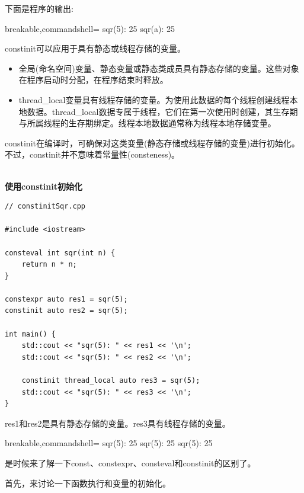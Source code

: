 下面是程序的输出:

\begin{tcblisting}{breakable,commandshell={}}
sqr(5): 25
sqr(a): 25
\end{tcblisting}


constinit可以应用于具有静态或线程存储的变量。

\begin{itemize}
\item 
全局(命名空间)变量、静态变量或静态类成员具有静态存储的变量。这些对象在程序启动时分配，在程序结束时释放。

\item 
thread\_local变量具有线程存储的变量。为使用此数据的每个线程创建线程本地数据。thread\_local数据专属于线程，它们在第一次使用时创建，其生存期与所属线程的生存期绑定。线程本地数据通常称为线程本地存储变量。
\end{itemize}

constinit在编译时，可确保对这类变量(静态存储或线程存储的变量)进行初始化。不过，constinit并不意味着常量性(consteness)。

\hspace*{\fill} \\ %
\noindent
\textbf{使用constinit初始化}
\begin{lstlisting}[style=styleCXX]
// constinitSqr.cpp

#include <iostream>

consteval int sqr(int n) {
	return n * n;
}

constexpr auto res1 = sqr(5);
constinit auto res2 = sqr(5);

int main() {
	std::cout << "sqr(5): " << res1 << '\n';
	std::cout << "sqr(5): " << res2 << '\n';
	
	constinit thread_local auto res3 = sqr(5);
	std::cout << "sqr(5): " << res3 << '\n';
}
\end{lstlisting}

res1和res2是具有静态存储的变量。res3具有线程存储的变量。

\begin{tcblisting}{breakable,commandshell={}}
sqr(5): 25
sqr(5): 25
sqr(5): 25
\end{tcblisting}

是时候来了解一下const、constexpr、consteval和constinit的区别了。

首先，来讨论一下函数执行和变量的初始化。



